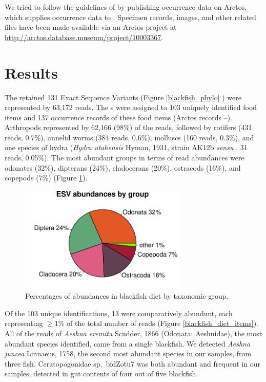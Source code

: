 \begin{multicols}{2}
We tried to follow the guidelines of \citet{Penevetal2017} by publishing occurrence data on Arctos, which supplies occurrence data to . Specimen records, images, and other related files have been made available via an Arctos project at \url{http://arctos.database.museum/project/10003367}.

\section{Results}

The retained 131 Exact Sequence Variants (Figure \ref{blackfish_phylo} ) were represented by 63,172 reads. The s were assigned to 103 uniquely identified food items and 137 occurrence records of these food items (Arctos records --). Arthropods represented by 62,166 (98\%) of the reads, followed by rotifers (431 reads, 0.7\%), annelid worms (384 reads, 0.6\%), molluscs (160 reads, 0.3\%), and one species of hydra (\textit{Hydra utahensis} Hyman, 1931, strain AK12b \textit{sensu} \citet{Martinezetal2010}, 31 reads, 0.05\%). The most abundant groups in terms of read abundances were odonates (32\%), dipterans (24\%), cladocerans (20\%), ostracods (16\%), and copepods (7\%) (Figure \ref{blackfish_pie_chart}).

\begin{figure}[H]
\begin{center}
\vspace{2mm}
\includegraphics[width=8cm]{img/blackfish_pie_chart.pdf}
\caption{Percentages of  abundances in blackfish diet by taxonomic group.}
\label{blackfish_pie_chart}
\end{center}
\end{figure} 

Of the 103 unique identifications, 13 were comparatively abundunt, each representing $\geq 1$\% of the total number of reads (Figure \ref{blackfish_diet_items}). All of the reads of \textit{Aeshna eremita} Scudder, 1866 (Odonata: Aeshnidae), the most abundant species identified, came from a single blackfish. We detected \textit{Aeshna juncea} Linnaeus, 1758, the second most abundant species in our samples, from three fish. Ceratopogonidae sp.\ bfdZotu7 was both abundant and frequent in our samples, detected in gut contents of four out of five blackfish.


\end{multicols}
